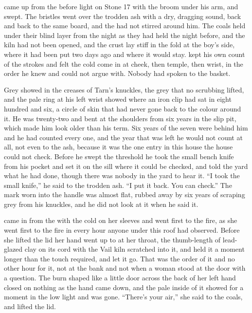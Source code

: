 
 came up from the  before light on Stone 17 with the broom under his arm, and swept. The bristles went over the trodden ash with a dry, dragging sound, back and back to the same board, and the  had not stirred around him. The coals held under their blind layer from the night as they had held the night before, and the kiln had not been opened, and the crust lay stiff in the fold at the boy's side, where it had been put two days ago and where it would stay.  kept his own count of the strokes and felt the cold come in at cheek, then temple, then wrist, in the order he knew and could not argue with. Nobody had spoken to the basket.

Grey  showed in the creases of Tarn's knuckles, the grey that no scrubbing lifted, and the pale ring at his left wrist showed where an iron clip had sat in eight hundred and six, a circle of skin that had never gone back to the colour around it. He was twenty-two and bent at the shoulders from six years in the slip pit, which made him look older than his term. Six years of the seven were behind him and he had counted every one, and the year that was left he would not count at all, not even to the ash, because it was the one entry in this house the house could not check. Before he swept the threshold he took the small bench knife from his pocket and set it on the sill where it could be checked, and told the yard what he had done, though there was nobody in the yard to hear it. “I took the small knife,” he said to the trodden ash. “I put it back. You can check.” The mark worn into the handle was almost flat, rubbed away by six years of scraping grey from his knuckles, and he did not look at it when he said it.

 came in from the  with the cold on her sleeves and went first to the fire, as she went first to the fire in every hour anyone under this roof had observed. Before she lifted the lid her hand went up to  at her throat, the thumb-length of lead-glazed clay on its cord with the Vail kiln scratched into it, and held it a moment longer than the touch required, and let it go. That was the order of it and no other hour for it, not at the bank and not when a woman stood at the door with a question. The burn shaped like a little door across the back of her left hand closed on nothing as the hand came down, and the pale inside of it showed for a moment in the low light and was gone. “There's your air,” she said to the coals, and lifted the lid.

